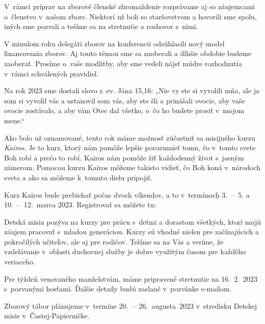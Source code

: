 V~rámci príprav na zborové členské zhromaždenie rozprávame aj so záujemcami o~členstvo v~našom zbore. Niektorí už boli so staršovstvom a hovorili sme spolu, iných sme pozvali a tešíme sa na stretnutie a rozhovor s~nimi.

V minulom roku delegáti zborov na konferencii odsúhlasili nový model financovania zborov. Aj touto témou sme sa zaoberali a dlhšie obdobie budeme zaoberať. Prosíme o~vaše modlitby, aby sme vedeli nájsť múdre rozhodnutia v~rámci schválených pravidiel.

Na rok 2023 sme dostali slovo z~ev. Jána 15,16: „Nie vy ste si vyvolili mňa, ale ja som si vyvolil vás a ustanovil som vás, aby ste šli a prinášali ovocie, aby vaše ovocie zostávalo, a aby vám Otec dal všetko, o~čo ho budete prosiť v~mojom mene.“

\vfill\break


Ako bolo už oznamované, tento rok máme možnosť zúčastniť sa misijného kurzu {\it Kairos}. Je to kurz, ktorý nám pomôže lepšie porozumieť tomu, čo v~tomto svete Boh robí a prečo to robí. Kairos nám pomôže žiť každodenný život s~jasným zámerom. Pomocou kurzu Kairos môžeme takisto vidieť, čo Boh koná v~národoch sveta a ako sa môžeme k~tomuto dielu pripojiť.

Kurz Kairos bude prebiehať počas dvoch víkendov, a to v~termínoch 3.~--~5. a 10.~--~12.~marca 2023. Registrovať sa môžete tu: 


Detská misia pozýva na kurzy pre prácu s~deťmi a dorastom všetkých, ktorí majú záujem pracovať s~mladou generáciou. Kurzy sú vhodné nielen pre začínajúcich a pokročilých učiteľov, ale aj pre rodičov. Tešíme sa na Vás a veríme, že vzdelávanie v~oblasti duchovnej služby je dobre využitým časom pre každého veriaceho.




Pre týždeň venovaného manželstvám, máme pripravené stretnutie na 16.~2.~2023 s~pozvanými hosťami. Ďalšie detaily budú zaslané v~pozvánke e-mailom.


Zborový tábor plánujeme v~termíne 20.~--~26.~augusta~2023 v~stredisku Detskej misie v~Častej-Papierničke.

